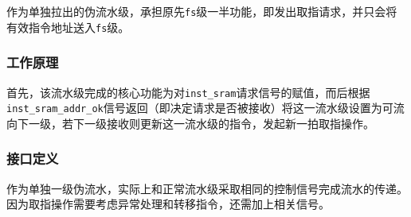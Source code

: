 \documentclass[UTF-8,twoside,c5size]{ctexart}
\begin{document}
	作为单独拉出的伪流水级，承担原先\texttt{fs}级一半功能，即发出取指请求，并只会将有效指令地址送入\texttt{fs}级。
	
	\subsubsection{工作原理}
	
	首先，该流水级完成的核心功能为对\texttt{inst_sram}请求信号的赋值，而后根据\texttt{inst_sram_addr_ok}信号返回（即决定请求是否被接收）将这一流水级设置为可流向下一级，若下一级接收则更新这一流水级的指令，发起新一拍取指操作。
	
	\subsubsection{接口定义}
	
	作为单独一级伪流水，实际上和正常流水级采取相同的控制信号完成流水的传递。因为取指操作需要考虑异常处理和转移指令，还需加上相关信号。
	
\end{document}
